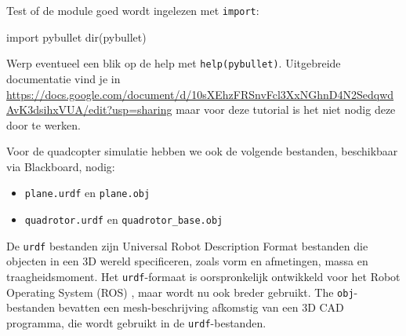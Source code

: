 \documentclass[a4paper,11pt]{article}
\begin{document}
Test of de module goed wordt ingelezen met \texttt{import}:
\begin{pyconsole}
import pybullet
dir(pybullet)

\end{pyconsole}
Werp eventueel een blik op de help met \texttt{help(pybullet)}. Uitgebreide
documentatie vind je in 
\url{https://docs.google.com/document/d/10sXEhzFRSnvFcl3XxNGhnD4N2SedqwdAvK3dsihxVUA/edit?usp=sharing}
maar voor deze tutorial is het niet nodig deze door te werken.

Voor de quadcopter simulatie hebben we ook de volgende bestanden, beschikbaar via Blackboard, nodig:
\begin{itemize}
\item \texttt{plane.urdf} en \texttt{plane.obj}
\item \texttt{quadrotor.urdf} en \texttt{quadrotor\_base.obj}
\end{itemize}
De \texttt{urdf} bestanden zijn Universal Robot Description Format bestanden die objecten in een 3D wereld specificeren, zoals vorm en afmetingen, massa en traagheidsmoment. Het \texttt{urdf}-formaat is oorspronkelijk ontwikkeld voor het Robot Operating System (ROS) \cite{ros}, maar wordt nu ook breder gebruikt. The \texttt{obj}-bestanden bevatten een mesh-beschrijving afkomstig van een 3D CAD programma, die wordt gebruikt in de \texttt{urdf}-bestanden.
\end{document}
